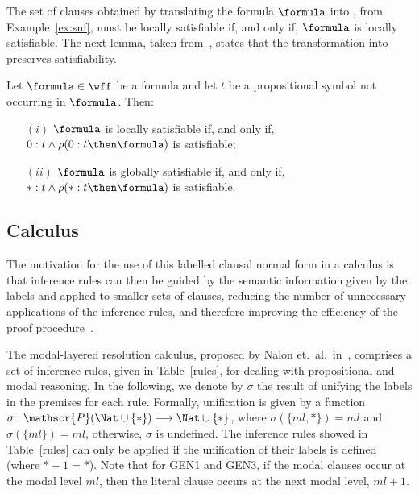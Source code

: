 The set of clauses obtained by translating the formula $\formula$ into
, from Example~\ref{ex:snf}, must be locally satisfiable if, and only
if, $\formula$ is locally satisfiable. The next lemma, taken
from~\cite{nalon2015modal}, states that the transformation into 
preserves satisfiability.

\begin{lemma}
    Let $\formula \in \wff$ be a formula and let $t$ be a propositional symbol
    not occurring in $\formula$. Then: 
    \begin{enumerate}
        \item[$(i)$] $\formula$ is locally satisfiable if, and only if, $0 : t \land \rho(0 : t \then \formula)$ is satisfiable;
        \item[$(ii)$] $\formula$ is globally satisfiable if, and only if, $* : t \land \rho(* : t \then \formula)$ is satisfiable.
    \end{enumerate}
\end{lemma}

\subsection{Calculus}%
\label{sec:calc}

The motivation for the use of this labelled clausal normal form in a calculus is
that inference rules can then be guided by the semantic information given by the
labels and applied to smaller sets of clauses, reducing the number of
unnecessary applications of the inference rules, and therefore improving the efficiency of the proof
procedure~\cite{Nalon2016}. 

The modal-layered resolution calculus, proposed by Nalon et.\ al.\
in~\cite{nalon2015modal}, comprises a set of inference rules, given in
Table~\ref{rules}, for dealing with propositional and modal reasoning. In the
following, we denote by $\sigma$ the result of unifying the labels in the
premises for each rule.  Formally, unification is given by a function $ \sigma :
\mathscr{P}(\Nat \cup \{*\}) \longrightarrow \Nat \cup \{*\}$, where $\sigma
(\{ml, *\}) = ml$ and $\sigma (\{ml\}) = ml$, otherwise, $\sigma$ is undefined.
The inference rules showed in Table~\ref{rules} can only be applied if the
unification of their labels is defined (where $* - 1 = *$). Note that for GEN1
and GEN3, if the modal clauses occur at the modal level $ml$, then the literal
clause occurs at the next modal level, $ml + 1$.

